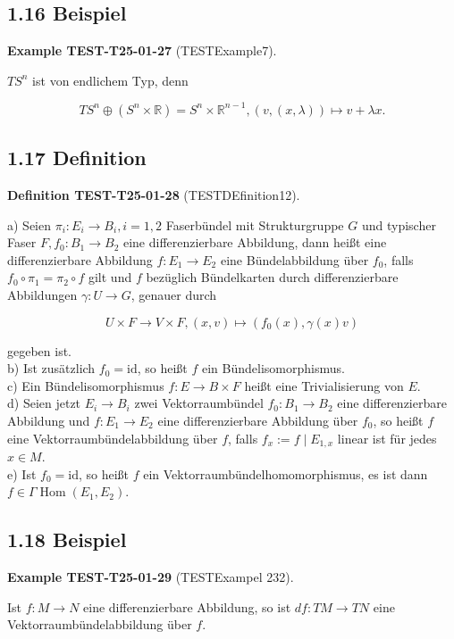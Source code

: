 \documentclass[10pt, letterpaper]{article}
\newcommand{\CustomHeading}[3]{%
  \par\medskip\noindent%
  \textbf{#1 #2} \textnormal{(#3)}.\enskip%
}
\newenvironment{DEF}[2]{\begin{unitbox}\CustomHeading{Definition}{#1}{#2}}{\end{unitbox}}
\newenvironment{EXA}[2]{\begin{unitbox}\CustomHeading{Example}{#1}{#2}}{\end{unitbox}}
\begin{document}
\subsection*{1.16 Beispiel}
\begin{EXA}{TEST-T25-01-27}{TESTExample7}
$T S^{n}$ ist von endlichem Typ, denn

$$
T S^{n} \oplus\left(S^{n} \times \mathbb{R}\right)=S^{n} \times \mathbb{R}^{n-1},(v,(x, \lambda)) \mapsto v+\lambda x .
$$
\end{EXA}

\subsection*{1.17 Definition}
\begin{DEF}{TEST-T25-01-28}{TESTDEfinition12}
a) Seien $\pi_{i}: E_{i} \rightarrow B_{i}, i=1,2$ Faserbündel mit Strukturgruppe $G$ und typischer Faser $F, f_{0}: B_{1} \rightarrow B_{2}$ eine differenzierbare Abbildung, dann heißt eine differenzierbare Abbildung $f: E_{1} \rightarrow E_{2}$ eine Bündelabbildung über $f_{0}$, falls $f_{0} \circ \pi_{1}=\pi_{2} \circ f$ gilt und $f$ bezüglich Bündelkarten durch differenzierbare Abbildungen $\gamma: U \rightarrow G$, genauer durch

$$
U \times F \rightarrow V \times F,(x, v) \mapsto\left(f_{0}(x), \gamma(x) v\right)
$$

gegeben ist.\\
b) Ist zusätzlich $f_{0}=\mathrm{id}$, so heißt $f$ ein Bündelisomorphismus.\\
c) Ein Bündelisomorphismus $f: E \rightarrow B \times F$ heißt eine Trivialisierung von $E$.\\
d) Seien jetzt $E_{i} \rightarrow B_{i}$ zwei Vektorraumbündel $f_{0}: B_{1} \rightarrow B_{2}$ eine differenzierbare Abbildung und $f: E_{1} \rightarrow E_{2}$ eine differenzierbare Abbildung über $f_{0}$, so heißt $f$ eine Vektorraumbündelabbildung über $f$, falls $f_{x}:=f \mid E_{1, x}$ linear ist für jedes $x \in M$.\\
e) Ist $f_{0}=\mathrm{id}$, so heißt $f$ ein Vektorraumbündelhomomorphismus, es ist dann $f \in \Gamma \operatorname{Hom}\left(E_{1}, E_{2}\right)$.
\end{DEF}

\subsection*{1.18 Beispiel}
\begin{EXA}{TEST-T25-01-29}{TESTExampel 232}
Ist $f: M \rightarrow N$ eine differenzierbare Abbildung, so ist $d f: T M \rightarrow T N$ eine Vektorraumbündelabbildung über $f$.
\end{EXA}
\end{document}
